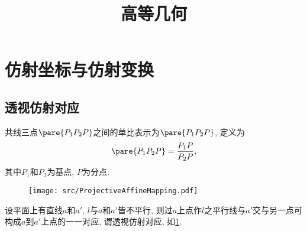 \documentclass{ctexart}
\title{高等几何}
\author{}
\date{}
\begin{document}
\maketitle

\section{仿射坐标与仿射变换} %
\label{sec:仿射坐标与仿射变换}

\subsection{透视仿射对应} %
\label{sub:透视仿射对应}

\begin{definition}
    共线三点$\pare{P_1P_2P}$之间的单比表示为$\pare{P_1P_2P}$, 定义为
    \[ \pare{P_1P_2P} = \frac{P_1P}{P_2P}, \]
    其中$P_1$和$P_2$为基点, $P$为分点.
\end{definition}
\begin{figure}[ht]
    \centering
    \texttt{[image: src/ProjectiveAffineMapping.pdf]}
    \caption{}
    \label{fig:透视仿射对应}
\end{figure}
\begin{definition}
    设平面上有直线$a$和$a'$, $l$与$a$和$a'$皆不平行, 则过$a$上点作$l$之平行线与$a'$交与另一点可构成$a$到$a'$上点的一一对应, 谓透视仿射对应, 如\cref{fig:透视仿射对应}.
\end{definition}


\end{document}
